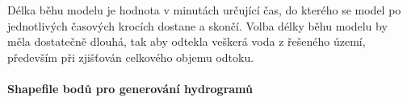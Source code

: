 
Délka běhu modelu je hodnota v minutách určující čas, do kterého se model po jednotlivých časových krocích dostane a skončí. Volba délky běhu modelu by měla dostatečně dlouhá, tak aby odtekla veškerá voda z řešeného území, především při zjišťován celkového objemu odtoku.
 




\paragraph{Shapefile bodů pro generování hydrogramů} \label{sec:vstupbody}

